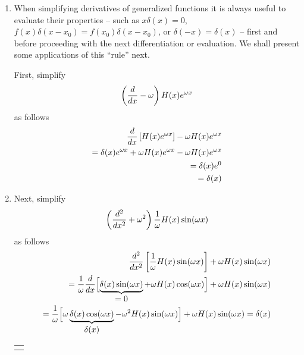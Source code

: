 {\begin{enumerate}
\item
When simplifying derivatives of generalized functions it is always useful to evaluate their properties
--
such as $x\delta(x)=0$, $f(x)\delta(x-x_0)=f(x_0)\delta(x-x_0)$, or $\delta (-x)=\delta (x)$
--
first and  before proceeding with the next differentiation or evaluation.
We shall present some applications of this ``rule'' next.

First, simplify
\begin{equation}
\left({d\over dx}-\omega \right)H (x)e^{\omega x}
\end{equation}
as follows
\begin{equation}
\begin{split}
 {d\over dx}\left[H(x)e^{\omega
x}\right]-\omega H(x)e^{\omega x}\\
  =
   \delta(x)e^{\omega x}+\omega H(x)e^{\omega x}-\omega H(x)
   e^{\omega x}\\
  =
   \delta(x)e^{0}
   \\
  =  \delta(x)
\end{split}
\end{equation}


\item
Next, simplify
\begin{equation}
\left({d^2\over dx^2}+\omega^2 \right){1\over \omega }H
 (x)\sin (\omega x)
\end{equation}
as follows
\begin{equation}
\begin{split}
{d^2\over dx^2}\left[{1\over\omega}H(x)\sin(\omega
x)\right]+\omega H(x)
      \sin(\omega x)\\
     =   {1\over\omega}{d\over dx}\Bigl[\underbrace{\delta(x)\sin(\omega x)}_
      {\mbox{$=0$}}+\omega H(x)\cos(\omega x)\Bigr]+\omega H(x)
      \sin(\omega x)\\
   =   {1\over\omega}\Bigl[\omega\underbrace{\delta(x)\cos(\omega x)}_
      {\mbox{$\delta(x)$}}-\omega^2H(x)\sin(\omega x)\Bigr]+
      \omega H(x)\sin(\omega x)=\delta(x)
\end{split}
\end{equation}

\begin{marginfigure}
{\color{black}
\begin{center}
\begin{tabular}{c}

\begin{tikzpicture}[ scale=0.4,
 declare function={
    func(\x)= (\x )
   ;
                  } ]


\end{tikzpicture}
\end{tabular}
\end{center}}
\end{marginfigure}
\end{enumerate}}
